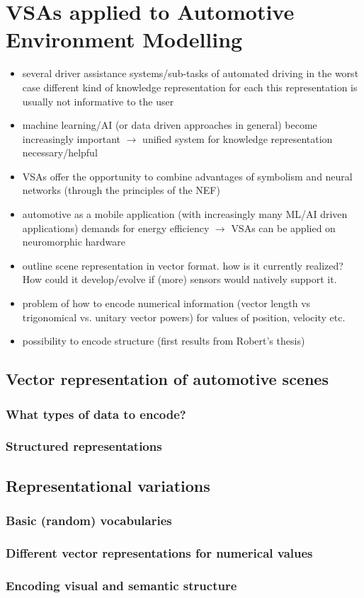 \chapter{\aclp{VSA} applied to Automotive Environment Modelling}

\begin{itemize}
	\item several driver assistance systems/sub-tasks of automated driving
	\subitem in the worst case different kind of knowledge representation for each
	\subitem this representation is usually not informative to the user
	
	\item machine learning/\ac{AI} (or data driven approaches in general) become increasingly important $\rightarrow$ unified system for knowledge representation necessary/helpful
	\item \aclp{VSA} offer the opportunity to combine advantages of symbolism and neural networks (through the principles of the \acf{NEF}) 
	\item automotive as a mobile application (with increasingly many ML/AI driven applications) demands for energy efficiency $\rightarrow$ \acp{VSA} can be applied on neuromorphic hardware
	\item outline scene representation in vector format. how is it currently realized? How could it develop/evolve if (more) sensors would natively support it.
	\item problem of how to encode numerical information (vector length vs trigonomical vs. unitary vector powers) for values of position, velocity etc. 
	\item possibility to encode structure (first results from Robert's thesis)
\end{itemize}

\section{Vector representation of automotive scenes}
\subsection{What types of data to encode?}
\subsection{Structured representations}
\section{Representational variations}
\subsection{Basic (random) vocabularies}
\subsection{Different vector representations for numerical values}
\subsection{Encoding visual and semantic structure}
